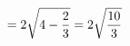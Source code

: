 \documentclass[preview]{standalone}
\begin{document}
\begin{align*}
\special{dvisvgm:raw <g id='unique000'>}=2\sqrt{4-\dfrac{2}{3}}=2\sqrt{\dfrac{10}{3}}\special{dvisvgm:raw </g>}
\end{align*}
\end{document}
